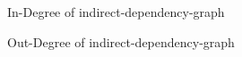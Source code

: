 \begin{figure}[indegree]
\centering
{}
\caption{In-Degree of indirect-dependency-graph}
\label{fig:indegree}
\end{figure}

\begin{figure}[outdegree]
\centering
{}
\caption{Out-Degree of indirect-dependency-graph}
\label{fig:outdegree}
\end{figure}

